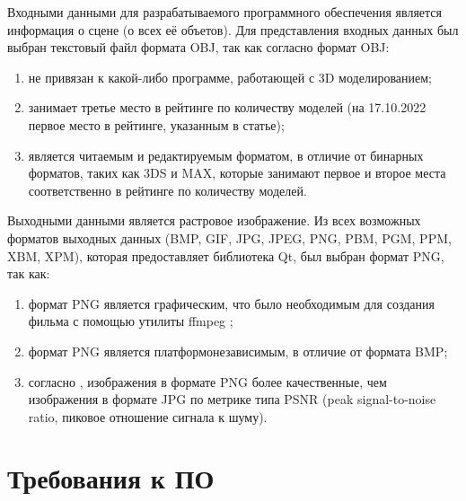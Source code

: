 Входными данными для разрабатываемого программного обеспечения является информация о сцене (о всех её объетов). Для представления входных данных был выбран текстовый файл формата OBJ, так как согласно \cite{3d} формат OBJ:
\begin{enumerate}[label=\arabic*)]
	\item не привязан к какой-либо программе, работающей с 3D моделированием;
	\item занимает третье место в рейтинге по количеству моделей (на 17.10.2022 первое место в рейтинге, указанным в статье);
	\item является читаемым и редактируемым форматом, в отличие от бинарных форматов, таких как 3DS и MAX, которые занимают первое и второе места соответственно в рейтинге по количеству моделей.
\end{enumerate}

Выходными данными является растровое изображение. Из всех возможных форматов выходных данных (BMP, GIF, JPG, JPEG, PNG, PBM, PGM, PPM, XBM, XPM), которая предоставляет библиотека Qt, был выбран формат PNG, так как:
\begin{enumerate}[label=\arabic*)]
	\item формат PNG является графическим, что было необходимым для создания фильма с помощью утилиты ffmpeg \cite{ffmpeg};
	\item формат PNG является платформонезависимым, в отличие от формата BMP;
	\item согласно \cite{jpgvspng}, изображения в формате PNG более качественные, чем изображения в формате JPG по метрике типа PSNR (peak signal-to-noise ratio, пиковое отношение сигнала к шуму).
\end{enumerate}

\clearpage
\section{Требования к ПО}

